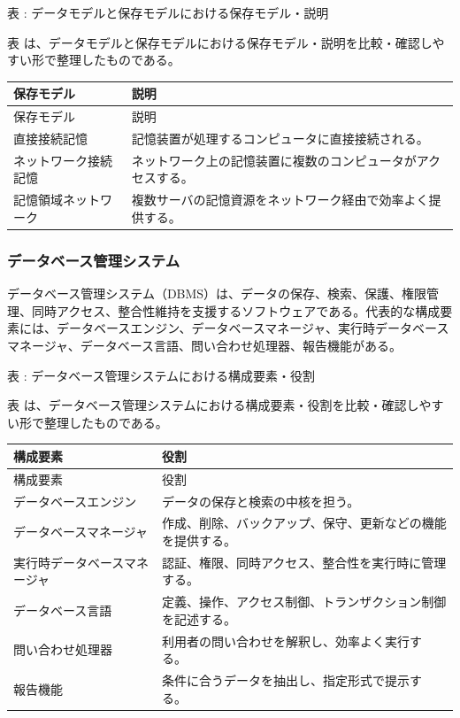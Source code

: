 \par\smallskip\noindent{}\label{tab:ch16-19}表 \thetable: データモデルと保存モデルにおける保存モデル・説明\par\smallskip
表 \thetable は、データモデルと保存モデルにおける保存モデル・説明を比較・確認しやすい形で整理したものである。\par\smallskip
\begin{longtable}{>{\raggedright\arraybackslash}p{}>{\raggedright\arraybackslash}p{}}
\toprule
保存モデル & 説明 \\
\midrule
\endfirsthead
\toprule
保存モデル & 説明 \\
\midrule
\endhead
直接接続記憶 & 記憶装置が処理するコンピュータに直接接続される。 \\
ネットワーク接続記憶 & ネットワーク上の記憶装置に複数のコンピュータがアクセスする。 \\
記憶領域ネットワーク & 複数サーバの記憶資源をネットワーク経由で効率よく提供する。 \\
\bottomrule
\end{longtable}

\subsubsection{データベース管理システム}

データベース管理システム（DBMS）は、データの保存、検索、保護、権限管理、同時アクセス、整合性維持を支援するソフトウェアである。代表的な構成要素には、データベースエンジン、データベースマネージャ、実行時データベースマネージャ、データベース言語、問い合わせ処理器、報告機能がある。

\par\smallskip\noindent{}\label{tab:ch16-20}表 \thetable: データベース管理システムにおける構成要素・役割\par\smallskip
表 \thetable は、データベース管理システムにおける構成要素・役割を比較・確認しやすい形で整理したものである。\par\smallskip
\begin{longtable}{>{\raggedright\arraybackslash}p{}>{\raggedright\arraybackslash}p{}}
\toprule
構成要素 & 役割 \\
\midrule
\endfirsthead
\toprule
構成要素 & 役割 \\
\midrule
\endhead
データベースエンジン & データの保存と検索の中核を担う。 \\
データベースマネージャ & 作成、削除、バックアップ、保守、更新などの機能を提供する。 \\
実行時データベースマネージャ & 認証、権限、同時アクセス、整合性を実行時に管理する。 \\
データベース言語 & 定義、操作、アクセス制御、トランザクション制御を記述する。 \\
問い合わせ処理器 & 利用者の問い合わせを解釈し、効率よく実行する。 \\
報告機能 & 条件に合うデータを抽出し、指定形式で提示する。 \\
\bottomrule
\end{longtable}

